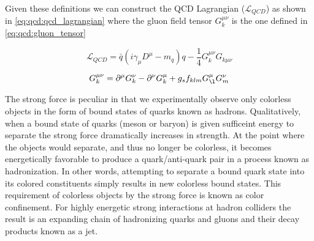 Given these definitions we can construct the QCD Lagrangian
($\mathcal{L}_{QCD}$) as shown in \cref{eq:qcd:qcd_lagrangian} where the
gluon field tensor $G_{k}^{\mu\nu}$ is the one defined in
\cref{eq:qcd:gluon_tensor}

\begin{equation} \label{eq:qcd:qcd_lagrangian}
\mathcal{L}_{QCD} = \bar{q}(i\gamma_{\mu}D^{\mu} - m_{q})q -
\frac{1}{4}G_{k}^{\mu\nu}G_{k\mu\nu}
\end{equation}

\begin{equation} \label{eq:qcd:gluon_tensor}
G_{k}^{\mu\nu} = \partial^{\mu}G_{k}^{\nu} - \partial^{\nu}G_{k}^{\mu} +
g_{s}f_{klm}G_{\l}^{\mu}G_{m}^{\nu}
\end{equation}

The strong force is peculiar in that we experimentally observe only colorless
objects in the form of bound states of quarks known as hadrons.  Qualitatively,
when a bound state of quarks (meson or baryon) is given sufficeint energy to
separate the strong force dramatically increases in strength.  At the point
where the objects would separate, and thus no longer be colorless, it becomes
energetically favorable to produce a quark/anti-quark pair in a process known as
hadronization.  In other words, attempting to separate a bound quark state into
its colored constituents simply results in new colorless bound states.  This
requirement of colorless objects by the strong force is known as color
confinement. For highly energetic strong interactions at hadron colliders the
result is an expanding chain of hadronizing quarks and gluons and their decay
products known as a jet.

